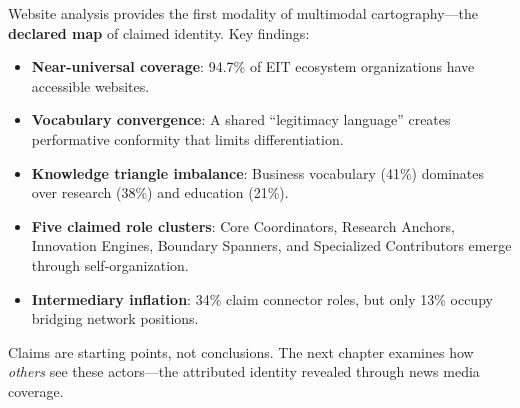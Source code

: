 \begin{summarybox}
Website analysis provides the first modality of multimodal cartography---the \textbf{declared map} of claimed identity. Key findings:

\begin{itemize}[leftmargin=*, itemsep=0.3em]
\item \textbf{Near-universal coverage}: 94.7\% of EIT ecosystem organizations have accessible websites.

\item \textbf{Vocabulary convergence}: A shared ``legitimacy language'' creates performative conformity that limits differentiation.

\item \textbf{Knowledge triangle imbalance}: Business vocabulary (41\%) dominates over research (38\%) and education (21\%).

\item \textbf{Five claimed role clusters}: Core Coordinators, Research Anchors, Innovation Engines, Boundary Spanners, and Specialized Contributors emerge through self-organization.

\item \textbf{Intermediary inflation}: 34\% claim connector roles, but only 13\% occupy bridging network positions.
\end{itemize}

Claims are starting points, not conclusions. The next chapter examines how \emph{others} see these actors---the attributed identity revealed through news media coverage.
\end{summarybox}

